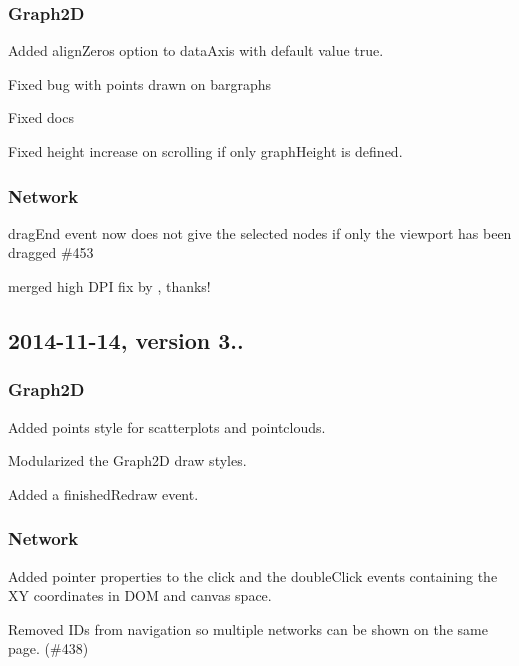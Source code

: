 \subsubsection*{Graph2D}


\begin{DoxyItemize}
\item Added {\ttfamily align\+Zeros} option to data\+Axis with default value true.
\item Fixed bug with points drawn on bargraphs
\item Fixed docs
\item Fixed height increase on scrolling if only {\ttfamily graph\+Height} is defined.
\end{DoxyItemize}

\subsubsection*{Network}


\begin{DoxyItemize}
\item drag\+End event now does not give the selected nodes if only the viewport has been dragged \#453
\item merged high D\+PI fix by , thanks!
\end{DoxyItemize}

\subsection*{2014-\/11-\/14, version 3..}

\subsubsection*{Graph2D}


\begin{DoxyItemize}
\item Added points style for scatterplots and pointclouds.
\item Modularized the Graph2D draw styles.
\item Added a finished\+Redraw event.
\end{DoxyItemize}

\subsubsection*{Network}


\begin{DoxyItemize}
\item Added pointer properties to the click and the double\+Click events containing the XY coordinates in D\+OM and canvas space.
\item Removed I\+Ds from navigation so multiple networks can be shown on the same page. (\#438)
\end{DoxyItemize}

